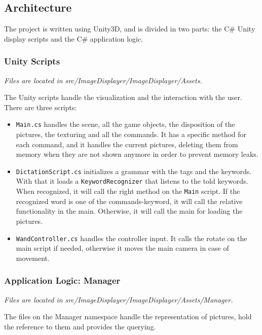 \documentclass[11pt,a4paper]{article}
\begin{document}


\subsection{Architecture}


The project is written using Unity3D, and is divided in two parts: the C$\#$ Unity display scripts and the C$\#$ application logic.

\subsubsection{Unity Scripts}
\textit{Files are located in src/ImageDisplayer/ImageDisplayer/Assets.}

The Unity scripts handle the visualization and the interaction with the user. 
There are three scripts:
\begin{itemize}
\item\texttt{Main.cs} handles the scene, all the game objects, the disposition of the pictures, the texturing and all the commands.
It has a specific method for each command, and it handles the current pictures, deleting them from memory when they are not shown anymore in order to prevent memory leaks.
\item \texttt{DictationScript.cs} initializes a grammar with the tags and the keywords. With that it loads a \texttt{KeywordRecognizer} that listens to the told keywords. When recognized, it will call the right method on the \texttt{Main} script.
If the recognized word is one of the commands-keyword, it will call the relative functionality in the main.
Otherwise, it will call the main for loading the pictures.
\item\texttt{WandController.cs} handles the controller input. It calls the rotate on the main script if needed, otherwise it moves the main camera in case of movement.
\end{itemize}

\subsubsection{Application Logic: Manager}
\textit{Files are located in src/ImageDisplayer/ImageDisplayer/Assets/Manager.}

The files on the Manager namespace handle the representation of pictures, hold the reference to them and provides the querying.
\end{document}
